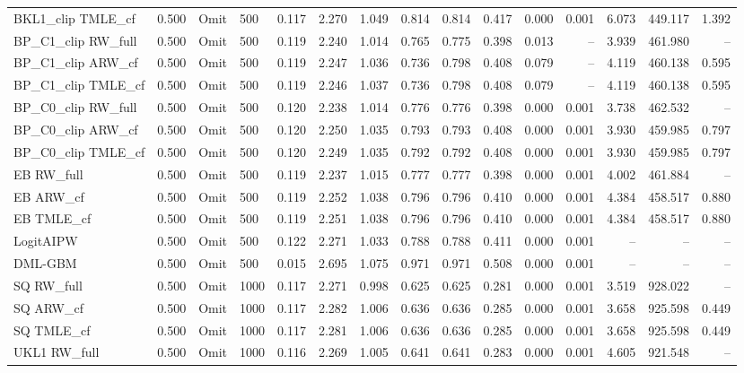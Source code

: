 \begin{tabular}{llllrrrrrrrrrrr}
BKL1\_clip TMLE\_cf & 0.500 & Omit & 500 & 0.117 & 2.270 & 1.049 & 0.814 & 0.814 & 0.417 & 0.000 & 0.001 & 6.073 & 449.117 & 1.392 \\
BP\_C1\_clip RW\_full & 0.500 & Omit & 500 & 0.119 & 2.240 & 1.014 & 0.765 & 0.775 & 0.398 & 0.013 & -- & 3.939 & 461.980 & -- \\
BP\_C1\_clip ARW\_cf & 0.500 & Omit & 500 & 0.119 & 2.247 & 1.036 & 0.736 & 0.798 & 0.408 & 0.079 & -- & 4.119 & 460.138 & 0.595 \\
BP\_C1\_clip TMLE\_cf & 0.500 & Omit & 500 & 0.119 & 2.246 & 1.037 & 0.736 & 0.798 & 0.408 & 0.079 & -- & 4.119 & 460.138 & 0.595 \\
BP\_C0\_clip RW\_full & 0.500 & Omit & 500 & 0.120 & 2.238 & 1.014 & 0.776 & 0.776 & 0.398 & 0.000 & 0.001 & 3.738 & 462.532 & -- \\
BP\_C0\_clip ARW\_cf & 0.500 & Omit & 500 & 0.120 & 2.250 & 1.035 & 0.793 & 0.793 & 0.408 & 0.000 & 0.001 & 3.930 & 459.985 & 0.797 \\
BP\_C0\_clip TMLE\_cf & 0.500 & Omit & 500 & 0.120 & 2.249 & 1.035 & 0.792 & 0.792 & 0.408 & 0.000 & 0.001 & 3.930 & 459.985 & 0.797 \\
EB RW\_full & 0.500 & Omit & 500 & 0.119 & 2.237 & 1.015 & 0.777 & 0.777 & 0.398 & 0.000 & 0.001 & 4.002 & 461.884 & -- \\
EB ARW\_cf & 0.500 & Omit & 500 & 0.119 & 2.252 & 1.038 & 0.796 & 0.796 & 0.410 & 0.000 & 0.001 & 4.384 & 458.517 & 0.880 \\
EB TMLE\_cf & 0.500 & Omit & 500 & 0.119 & 2.251 & 1.038 & 0.796 & 0.796 & 0.410 & 0.000 & 0.001 & 4.384 & 458.517 & 0.880 \\
LogitAIPW & 0.500 & Omit & 500 & 0.122 & 2.271 & 1.033 & 0.788 & 0.788 & 0.411 & 0.000 & 0.001 & -- & -- & -- \\
DML-GBM & 0.500 & Omit & 500 & 0.015 & 2.695 & 1.075 & 0.971 & 0.971 & 0.508 & 0.000 & 0.001 & -- & -- & -- \\
SQ RW\_full & 0.500 & Omit & 1000 & 0.117 & 2.271 & 0.998 & 0.625 & 0.625 & 0.281 & 0.000 & 0.001 & 3.519 & 928.022 & -- \\
SQ ARW\_cf & 0.500 & Omit & 1000 & 0.117 & 2.282 & 1.006 & 0.636 & 0.636 & 0.285 & 0.000 & 0.001 & 3.658 & 925.598 & 0.449 \\
SQ TMLE\_cf & 0.500 & Omit & 1000 & 0.117 & 2.281 & 1.006 & 0.636 & 0.636 & 0.285 & 0.000 & 0.001 & 3.658 & 925.598 & 0.449 \\
UKL1 RW\_full & 0.500 & Omit & 1000 & 0.116 & 2.269 & 1.005 & 0.641 & 0.641 & 0.283 & 0.000 & 0.001 & 4.605 & 921.548 & -- \\

\end{tabular}
